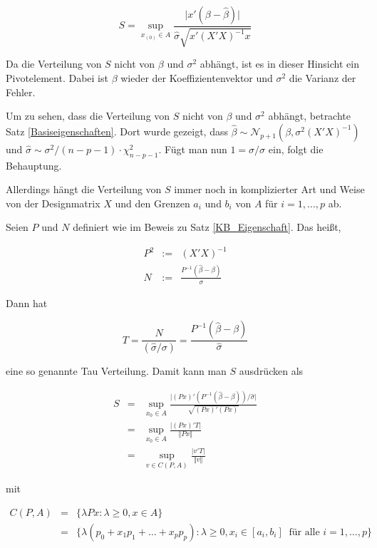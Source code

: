 \documentclass[12pt,a4paper]{article}
\theoremstyle{definition}
\theoremstyle{definition}
\theoremstyle{definition}
\theoremstyle{definition}
\begin{document}
\begin{equation*}
S = \sup_{x_{(0)} \in A} \frac{\vert x'(\beta - \hat{\beta}) \vert}{\hat{\sigma} \sqrt{x'(X'X)^{-1}x}}
\end{equation*}

Da die Verteilung von $S$ nicht von $\beta$ und $\sigma^2$ abhängt, ist es in dieser Hinsicht ein Pivot\-element. Dabei ist $\beta$ wieder der Koeffizientenvektor und $\sigma^2$ die Varianz der Fehler. 

Um zu sehen, dass die Verteilung von $S$ nicht von $\beta$ und $\sigma^2$ abhängt, betrachte Satz \ref{Basiseigenschaften}. Dort wurde gezeigt, dass $\hat{\beta} \sim \mathscr{N}_{p+1}(\beta, \sigma^2 (X'X)^{-1})$ und $\hat{\sigma} \sim \sigma^2/(n-p-1) \cdot \chi^2_{n-p-1}$. Fügt man nun $1=\sigma / \sigma$ ein, folgt die Behauptung.

Allerdings hängt die Verteilung von $S$ immer noch in komplizierter Art und Weise von der Designmatrix $X$ und den Grenzen $a_i$ und $b_i$ von $A$ für $i=1, \ldots, p$ ab.

Seien $P$ und $N$ definiert wie im Beweis zu Satz \ref{KB_Eigenschaft}. Das heißt, 

\begin{eqnarray*}
P^2 &:=& (X'X)^{-1} \\
N &:=& \frac{P^{-1}(\hat{\beta}-\beta)}{\sigma}
\end{eqnarray*}

Dann hat 

\begin{equation*}
T = \frac{N}{(\hat{\sigma} /\sigma)} = \frac{P^{-1}(\hat{\beta}-\beta)}{\hat{\sigma}}
\end{equation*}

eine so genannte \gls{Tau} Verteilung. Damit kann man $S$ ausdrücken als

\begin{eqnarray*}
S &=& \sup_{x_{0} \in A} \frac{\vert(Px)'(P^{-1} (\hat{\beta}-\beta)) / \hat{\sigma} \vert}{\sqrt{(Px)'(Px)}}\\
&=& \sup_{x_{0} \in A} \frac{\vert (Px)' T \vert}{\Vert Px \Vert} \\
&=& \sup_{v \in C(P,A)} \frac{\vert v'T \vert}{\Vert v \Vert}
\end{eqnarray*}

mit 

\begin{eqnarray*}
C(P,A) &=& \{ \lambda P x : \lambda \geq 0, x \in A \} \\
&=& \{ \lambda (p_0+x_1 p_1 + \ldots +x_p p_p) : \lambda \geq 0, x_i \in [a_i,b_i] ~ \text{ für alle } i=1,\ldots,p \}
\end{eqnarray*}
\end{document}
